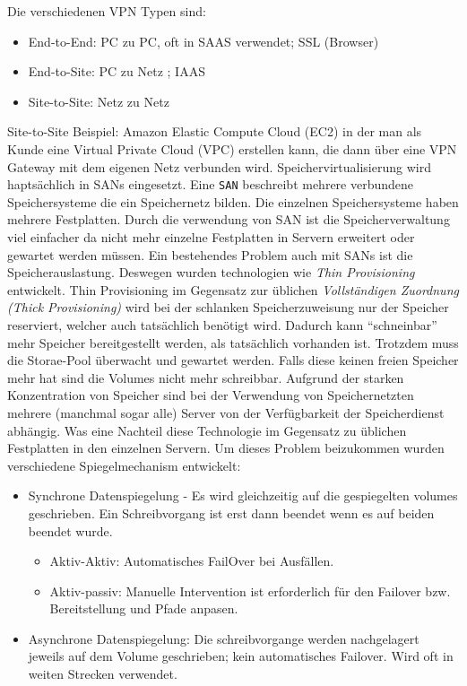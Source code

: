 \documentclass[a4paper,10pt]{article}
\begin{document}
\vspace{3mm}
Die verschiedenen VPN Typen sind:
\begin{itemize}
	\item End-to-End: PC zu PC, oft in SAAS verwendet; SSL (Browser)
	\item End-to-Site: PC zu Netz ; IAAS
	\item Site-to-Site: Netz zu Netz
\end{itemize}
Site-to-Site Beispiel: \newline
Amazon Elastic Compute Cloud (EC2) in der man als Kunde eine Virtual Private Cloud (VPC) erstellen kann, die dann über eine VPN Gateway mit dem eigenen Netz verbunden wird.
\vspace{3mm}
Speichervirtualisierung wird haptsächlich in SANs eingesetzt. Eine \texttt{SAN} beschreibt mehrere verbundene Speichersysteme die ein Speichernetz bilden. Die einzelnen Speichersysteme haben mehrere Festplatten. Durch die verwendung von SAN ist die Speicherverwaltung viel einfacher da nicht mehr einzelne Festplatten in Servern erweitert oder gewartet werden müssen.
\vspace{3mm}
Ein bestehendes Problem auch mit SANs ist die Speicherauslastung. Deswegen wurden technologien wie \textit{Thin Provisioning} entwickelt. Thin Provisioning im Gegensatz zur üblichen \textit{Vollständigen Zuordnung (Thick Provisioning)} wird bei der schlanken Speicherzuweisung nur der Speicher reserviert, welcher auch tatsächlich benötigt wird. Dadurch kann ``schneinbar'' mehr Speicher bereitgestellt werden, als tatsächlich vorhanden ist. Trotzdem muss die Storae-Pool überwacht und gewartet werden. Falls diese keinen freien Speicher mehr hat sind die Volumes nicht mehr schreibbar. Aufgrund der starken Konzentration von Speicher sind bei der Verwendung von Speichernetzten mehrere (manchmal sogar alle) Server von der Verfügbarkeit der Speicherdienst abhängig. Was eine Nachteil diese Technologie im Gegensatz zu üblichen Festplatten in den einzelnen Servern. \newline
Um dieses Problem beizukommen wurden verschiedene Spiegelmechanism entwickelt: \begin{itemize}
	\item Synchrone Datenspiegelung  - Es wird gleichzeitig auf die gespiegelten volumes geschrieben. Ein Schreibvorgang ist erst dann beendet wenn es auf beiden beendet wurde.
		\begin{itemize}
			\item Aktiv-Aktiv: Automatisches FailOver bei Ausfällen.
			\item Aktiv-passiv: Manuelle Intervention ist erforderlich für den Failover bzw. Bereitstellung und Pfade anpasen.
		\end{itemize}
	\item Asynchrone Datenspiegelung: Die schreibvorgange werden nachgelagert jeweils auf dem Volume geschrieben; kein automatisches Failover. Wird oft in weiten Strecken verwendet.
\end{itemize}
\end{document}
